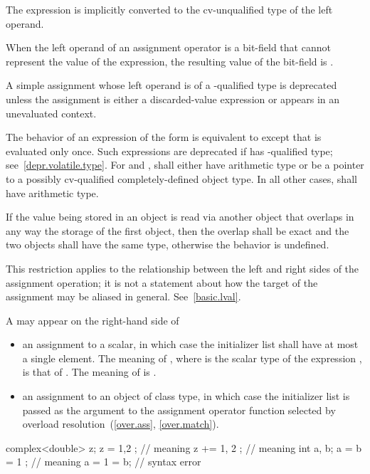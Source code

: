 \pnum
{}%
The expression is implicitly
converted to the cv-unqualified type of the left
operand.

\pnum
{}%
When the left operand of an assignment operator
is a bit-field that cannot represent the value of the expression, the
resulting value of the bit-field is
.

\pnum
A simple assignment whose left operand is of
a -qualified type is deprecated
unless the assignment is either a discarded-value expression or
appears in an unevaluated context.

\pnum
The behavior of an expression of the form 
is equivalent to  except
that  is evaluated only once.
Such expressions are deprecated
if  has -qualified type; see~\ref{depr.volatile.type}.
For \tcode{+=} and \tcode{-=},
 shall either have arithmetic type or be a pointer to a
possibly cv-qualified completely-defined object type. In all other
cases,  shall have arithmetic type.

\pnum
If the value being stored in an object is read via another object that
overlaps in any way the storage of the first object, then the overlap shall be
exact and the two objects shall have the same type, otherwise the behavior is
undefined.
\begin{note}
This restriction applies to the relationship
between the left and right sides of the assignment operation; it is not a
statement about how the target of the assignment may be aliased in general.
See~\ref{basic.lval}.
\end{note}

\pnum
A  may appear on the right-hand side of
\begin{itemize}
\item an assignment to a scalar, in which case the initializer list shall have
at most a single element. The meaning of , where  is the
scalar type of the expression , is that of . The meaning of
 is .

\item an assignment to an object of class type, in which case the initializer
list is passed as the argument to the assignment operator function selected by
overload resolution~(\ref{over.ass}, \ref{over.match}).
\end{itemize}
\begin{example}
\begin{codeblock}
complex<double> z;
z = { 1,2 };        // meaning 
z += { 1, 2 };      // meaning 
int a, b;
a = b = { 1 };      // meaning 
a = { 1 } = b;      // syntax error
\end{codeblock}
\end{example}

